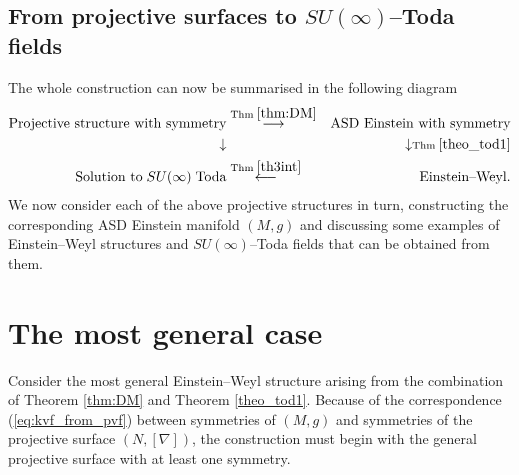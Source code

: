 \subsection{From projective surfaces to $SU(\infty)$--Toda fields}
The whole construction can now be summarised in the following diagram
\begin{eqnarray}
\label{diagram}
\text{Projective structure with symmetry} &\overset{\text{Thm}\;\ref{thm:DM}}
{\longrightarrow}& \text{ASD Einstein with symmetry}\nonumber\\
\downarrow & & \downarrow \scriptstyle{\text{Thm}\;\ref{theo_tod1}}\\
\text{Solution to}\;SU(\infty)\; \text{Toda} &\overset{\text{Thm}\;\ref{th3int}}\longleftarrow&\text{Einstein--Weyl.}\nonumber
\end{eqnarray}
We now consider each of the above projective structures in turn, constructing the corresponding ASD Einstein manifold $(M,g)$ and discussing some examples of Einstein--Weyl structures and $SU(\infty)$--Toda fields that can be obtained from them.


\section{The most general case}
\label{general}

Consider the most general Einstein--Weyl structure arising from the combination
of Theorem \ref{thm:DM} and Theorem \ref{theo_tod1}. Because of the correspondence (\ref{eq:kvf_from_pvf}) between symmetries of $(M, g)$ and symmetries of the projective surface $(N, [\nabla])$, the construction must begin with the general projective surface with at least one symmetry. 
 
